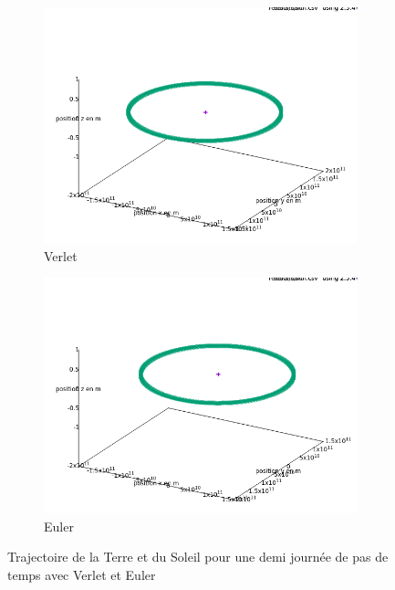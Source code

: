 \documentclass[11pt]{article}
\begin{document}
\begin{figure}[H]
\begin{subfigure}{0.5\textwidth}
\includegraphics[width=1\linewidth]{eulerverlet/positions_terre_soleil_verlet.png}
\caption{Verlet}
\label{fig:6subim1}
\end{subfigure}
\begin{subfigure}{0.5\textwidth}
\includegraphics[width=1\linewidth]{eulerverlet/positions_terre_soleil_euler.png}
\caption{Euler}
\label{fig:6subim2}
\end{subfigure}

\caption{Trajectoire de la Terre et du Soleil pour une demi journée de pas de temps avec Verlet et Euler}
\label{fig:image2}
\end{figure}
\end{document}
